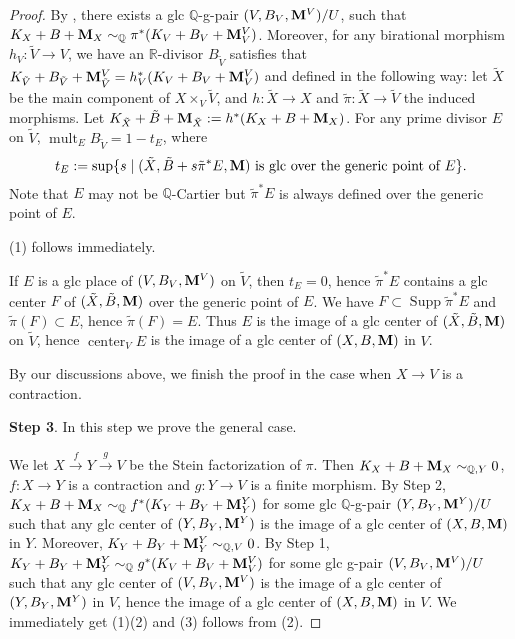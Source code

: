 \documentclass[11pt]{amsart}
\numberwithin{equation}{section}
\newcommand{\Mm}{{\bf{M}}}
\newcommand{\Qq}{\mathbb{Q}}
\newcommand{\Rr}{\mathbb{R}}
\newcommand{\Center}{\operatorname{center}}
\newcommand{\Supp}{\operatorname{Supp}}
\newcommand{\mult}{\operatorname{mult}}
\theoremstyle{definition}
\theoremstyle{definition}
\theoremstyle{definition}
\begin{document}
\begin{proof}
By \cite[Theorem 2.20]{FS20}, there exists a glc $\Qq$-g-pair $(V,B_V,\Mm^V)/U$, such that $K_X+B+\Mm_X\sim_{\mathbb Q}\pi^*(K_V+B_V+\Mm^V_V)$. Moreover, for any birational morphism $h_V: \tilde V\rightarrow V$, we have an $\Rr$-divisor $B_{\tilde V}$ satisfies that $K_{\tilde V}+B_{\tilde V}+\Mm^V_{\tilde V}=h_V^*(K_V+B_V+\Mm^V_V)$ and defined in the following way: let $\tilde X$ be the main component of $X\times_{V}\tilde V$, and $h: \tilde X\rightarrow X$ and $\tilde\pi: \tilde X\rightarrow\tilde V$ the induced morphisms. Let $K_{\tilde X}+\tilde B+\Mm_{\tilde X}:=h^*(K_X+B+\Mm_X)$. For any prime divisor $E$ on $\tilde V$, $\mult_{E}B_{\tilde V}=1-t_E$, where $$t_E:=\sup\{s\mid (\tilde X,\tilde B+s\tilde \pi^*E,\Mm)\text{ is glc over the generic point of }E\}.$$
Note that $E$ may not be $\Qq$-Cartier but $\tilde \pi^*E$ is always defined over the generic point of $E$. 

(1) follows immediately. 

If $E$ is a glc place of $(V,B_V,\Mm^V)$ on $\tilde V$, then $t_E=0$, hence $\tilde \pi^*E$ contains a glc center $F$ of $(\tilde X,\tilde B,\Mm)$ over the generic point of $E$. We have $F\subset\Supp\tilde\pi^*E$ and $\tilde\pi(F)\subset E$, hence $\tilde\pi(F)=E$. Thus $E$ is the image of a glc center of $(\tilde X,\tilde B,\Mm)$ on $\tilde V$, hence $\Center_{V}E$ is the image of a glc center of $(X,B,\Mm)$ in $V$. 

By our discussions above, we finish the proof in the case when $X\rightarrow V$ is a contraction.

\medskip

\noindent\textbf{Step 3}. In this step we prove the general case. 

We let $X\xrightarrow{f}Y\xrightarrow{g}V$ be the Stein factorization of $\pi$. Then $K_X+B+\Mm_X\sim_{\Qq,Y}0$, $f: X\rightarrow Y$ is a contraction and $g: Y\rightarrow V$ is a finite morphism. By Step 2, $K_X+B+\Mm_X\sim_{\Qq}f^*(K_Y+B_Y+\Mm^Y_Y)$ for some glc $\Qq$-g-pair $(Y,B_Y,\Mm^Y)/U$ such that any glc center of $(Y,B_Y,\Mm^Y)$ is the image of a glc center of $(X,B,\Mm)$ in $Y$. Moreover, $K_Y+B_Y+\Mm^Y_Y\sim_{\Qq,V}0$. By Step 1, $K_Y+B_Y+\Mm^Y_Y\sim_{\Qq}g^*(K_V+B_V+\Mm^V_V)$ for some glc g-pair $(V,B_V,\Mm^V)/U$ such that any glc center of $(V,B_V,\Mm^V)$ is the image of a glc center of $(Y,B_Y,\Mm^Y)$ in $V$, hence the image of a glc center of $(X,B,\Mm)$ in $V$. We immediately get (1)(2) and (3) follows from (2).
\end{proof}
\end{document}
